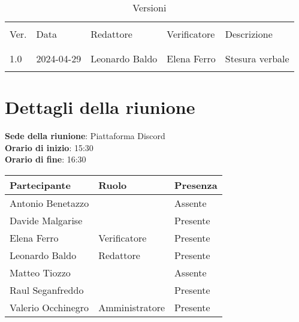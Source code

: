 \documentclass[italian,12pt]{article}
\begin{document}


\newpage



\begin{table}[!h]
	\caption{Versioni}
	\footnotesize
	\begin{center}
		\begin{tabular}{ l l l l l }
			\hline \\[-2ex]
			Ver. & Data       & Redattore      & Verificatore      & Descrizione     \\
			\\[-2ex] \hline \\[-1.5ex]
			1.0  & 2024-04-29 & Leonardo Baldo & Elena Ferro & Stesura verbale \\
			\\[-1.5ex] \hline
		\end{tabular}
	\end{center}
\end{table}

\newpage

\tableofcontents

\newpage

\section{Dettagli della riunione}


\textbf{Sede della riunione}: Piattaforma Discord\\
\textbf{Orario di inizio}: 15:30\\
\textbf{Orario di fine}: 16:30\\


\begin{flushleft}
	\begin{table}[!h]
	\begin{tabular}{ |l|l|l| } 
		\hline
		\textbf{Partecipante} & \textbf{Ruolo}       & \textbf{Presenza} \\
		\hline 
		Antonio Benetazzo     &                      & Assente           \\
		Davide Malgarise      &                      & Presente          \\
		Elena Ferro           & Verificatore         & Presente          \\
		Leonardo Baldo        & Redattore            & Presente          \\
		Matteo Tiozzo         &                      & Assente           \\
		Raul Seganfreddo      &                      & Presente          \\
		Valerio Occhinegro    & Amministratore       & Presente          \\
		\hline
	\end{tabular}
	\end{table}
\end{flushleft}
\end{document}
